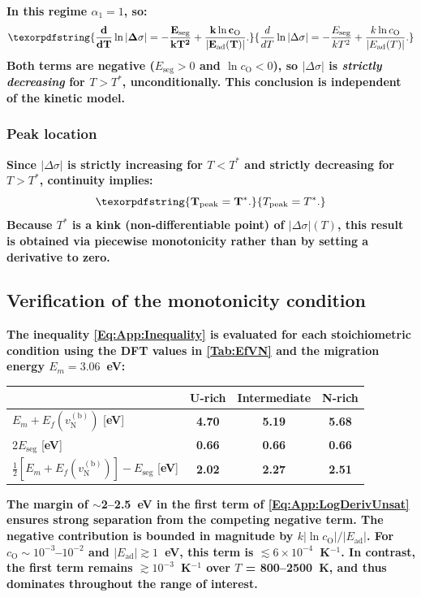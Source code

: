 \documentclass[preprint,12pt,sort&compress]{elsarticle}
\newcommand{\?}{\stackrel{?}{=}}
\providecommand{\DIFaddtex}[1]{{\bf #1}} %
\providecommand{\DIFaddFL}[1]{\DIFadd{#1}} %
\providecommand{\DIFadd}[1]{\texorpdfstring{\DIFaddtex{#1}}{#1}} %
\begin{document}
\DIFadd{In this regime $\alpha_1 = 1$, so:
}\begin{equation}
\DIFadd{\frac{d}{dT}\ln|\Delta \sigma| = -\frac{E_\text{seg}}{kT^2} + \frac{k\ln c_\text{O}}{|E_\text{ad}(T)|}.
\label{Eq:App:LogDerivSat}
}\end{equation}
\DIFadd{Both terms are negative ($E_\text{seg} > 0$ and $\ln c_\text{O} < 0$), so $|\Delta \sigma|$ is \emph{strictly decreasing} for $T > T^*$, unconditionally. This conclusion is independent of the kinetic model.
}

\subsubsection{\DIFadd{Peak location}}

\DIFadd{Since $|\Delta \sigma|$ is strictly increasing for $T < T^*$ and strictly decreasing for $T > T^*$, continuity implies:
}\begin{equation}
\DIFadd{T_\text{peak} = T^*.
\label{Eq:App:TpeakIsTstar}
}\end{equation}
\DIFadd{Because $T^*$ is a kink (non-differentiable point) of $|\Delta \sigma|(T)$, this result is obtained via piecewise monotonicity rather than by setting a derivative to zero.
}

\subsection{\DIFadd{Verification of the monotonicity condition}}
\label{App:Tpeak:Verification}

\DIFadd{The inequality \cref{Eq:App:Inequality} is evaluated for each stoichiometric condition using the DFT values in \cref{Tab:EfVN} and the migration energy $E_m = 3.06$~eV:
}\begin{table}
\footnotesize
\centering
\begin{tabular}{lccc}
\hline
 & \DIFaddFL{U-rich }& \DIFaddFL{Intermediate }& \DIFaddFL{N-rich }\\
\hline
\DIFaddFL{$E_m + E_f(v_\text{N}^{(\text{b})})$ }[\DIFaddFL{eV}] & \DIFaddFL{4.70 }& \DIFaddFL{5.19 }& \DIFaddFL{5.68 }\\
\DIFaddFL{$2E_\text{seg}$ }[\DIFaddFL{eV}] & \DIFaddFL{0.66 }& \DIFaddFL{0.66 }& \DIFaddFL{0.66 }\\
\DIFaddFL{$\tfrac{1}{2}[E_m + E_f(v_\text{N}^{(\text{b})})] - E_\text{seg}$ }[\DIFaddFL{eV}] & \DIFaddFL{2.02 }& \DIFaddFL{2.27 }& \DIFaddFL{2.51 }\\
\hline
\end{tabular}
\end{table}
\DIFadd{The margin of $\sim$2--2.5~eV in the first term of \cref{Eq:App:LogDerivUnsat} ensures strong separation from the competing negative term. The negative contribution is bounded in magnitude by $k|\ln c_\text{O}|/|E_\text{ad}|$. For $c_\text{O} \sim 10^{-3}$--$10^{-2}$ and $|E_\text{ad}| \gtrsim 1$~eV, this term is $\lesssim 6 \times 10^{-4}$~K$^{-1}$. In contrast, the first term remains $\gtrsim 10^{-3}$~K$^{-1}$ over $T$ = 800--2500~K, and thus dominates throughout the range of interest.
}
\end{document}
